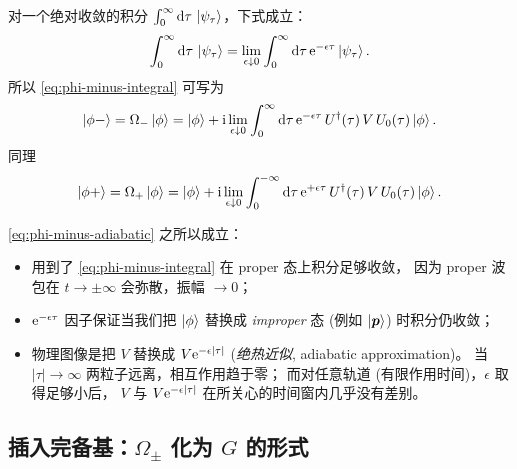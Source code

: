 对一个绝对收敛的积分 $\int_0^\infty\mathrm{d}\tau\,\ket{\psi_\tau}$，下式成立：
\begin{equation}
  \int_0^\infty\mathrm{d}\tau\,\ket{\psi_\tau}
  = \lim_{\epsilon\downarrow 0}\int_0^\infty\mathrm{d}\tau\,
    \mathrm{e}^{-\epsilon\tau}\ket{\psi_\tau}.
\end{equation}
所以 \eqref{eq:phi-minus-integral} 可写为
\begin{equation}\label{eq:phi-minus-adiabatic}
  \ket{\phi-} = \Omega_-\ket\phi
  = \ket\phi + \mathrm{i}\lim_{\epsilon\downarrow 0}
    \int_0^{\infty}\mathrm{d}\tau\,\mathrm{e}^{-\epsilon\tau}\,
    U^\dagger(\tau)\,V\,U_0(\tau)\ket\phi.
\end{equation}
同理
\begin{equation}\label{eq:phi-plus-adiabatic}
  \ket{\phi+} = \Omega_+\ket\phi
  = \ket\phi + \mathrm{i}\lim_{\epsilon\downarrow 0}
    \int_0^{-\infty}\mathrm{d}\tau\,\mathrm{e}^{+\epsilon\tau}\,
    U^\dagger(\tau)\,V\,U_0(\tau)\ket\phi.
\end{equation}
\begin{remark}
\eqref{eq:phi-minus-adiabatic} 之所以成立：
\begin{itemize}
  \item 用到了 \eqref{eq:phi-minus-integral} 在 proper 态上积分足够收敛，
        因为 proper 波包在 $t\to\pm\infty$ 会弥散，振幅 $\to 0$；
  \item $\mathrm{e}^{-\epsilon\tau}$ 因子保证当我们把 $\ket\phi$ 替换成 \emph{improper} 态
        (例如 $\ket{\bm p}$) 时积分仍收敛；
  \item 物理图像是把 $V$ 替换成 $V\mathrm{e}^{-\epsilon|\tau|}$
        (\emph{绝热近似}, adiabatic approximation)。
        当 $|\tau|\to\infty$ 两粒子远离，相互作用趋于零；
        而对任意轨道 (有限作用时间)，$\epsilon$ 取得足够小后，
        $V$ 与 $V\mathrm{e}^{-\epsilon|\tau|}$ 在所关心的时间窗内几乎没有差别。
\end{itemize}
\end{remark}

\subsection{插入完备基：$\Omega_\pm$ 化为 $G$ 的形式}

